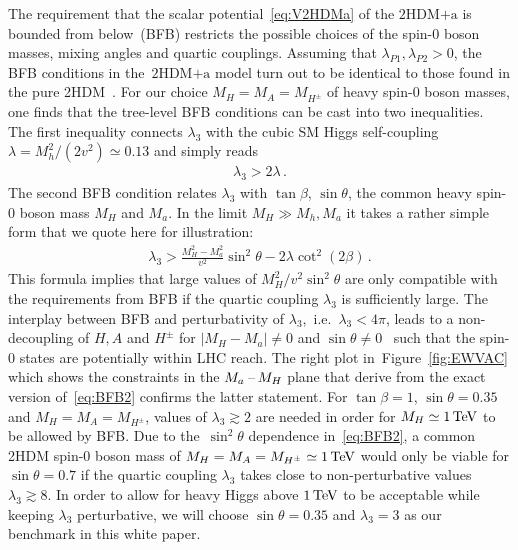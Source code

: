\documentclass[review]{elsarticle}
\newcommand{\hdma}{\ensuremath{\textrm{2HDM+a}}\xspace}
\begin{document}
The requirement that the scalar potential~\eqref{eq:V2HDMa} of the \hdma  is bounded from below~(BFB) restricts the possible choices of the spin-0 boson masses, mixing angles and quartic couplings. Assuming that $\lambda_{P1}, \lambda_{P2} > 0$, the  BFB conditions in the~\hdma model turn out to be identical to those found in the pure 2HDM~\cite{Gunion:2002zf}. For our choice $M_H = M_A = M_{H^\pm}$ of heavy spin-0 boson masses, one finds that the tree-level BFB conditions can be cast into  two inequalities. The first inequality connects $\lambda_3$ with the cubic SM Higgs self-coupling $\lambda = M_h^2/(2 v^2) \simeq 0.13$ and simply reads   
\begin{align} \label{eq:BFB1}
\lambda_3 > 2 \lambda  \,.
\end{align}
The second BFB condition relates $\lambda_3$ with $\tan \beta$, $\sin \theta$, the common heavy  spin-0 boson  mass $M_H$ and $M_a$. In the limit $M_H \gg M_h, M_a$ it takes a rather simple form that we quote here for illustration: 
\begin{align} \label{eq:BFB2}
\lambda_3 > \frac{M_H^2 -M_a^2}{v^2} \sin^2 \theta  - 2 \lambda \cot^2 (2 \beta )  \,.
\end{align}
This formula implies that large values of $M_H^2/v^2 \sin^2 \theta$ are only compatible with the requirements from BFB if the quartic coupling $\lambda_3$ is sufficiently large.  The interplay between BFB and perturbativity of $\lambda_3$,~i.e.~$\lambda_3 < 4 \pi$, leads to a non-decoupling of $H, A$ and $H^\pm$ for $|M_H - M_a| \neq 0$ and $\sin \theta  \neq 0$~\cite{Goncalves:2016iyg} such that the spin-0 states are potentially within LHC reach. The right plot in~Figure~\ref{fig:EWVAC} which shows the constraints in the $M_{a}\hspace{0.5mm}$--$\hspace{0.5mm} M_H$ plane that derive from the exact version of~\eqref{eq:BFB2} confirms the latter statement. For $\tan \beta = 1$, $\sin \theta = 0.35$ and $M_H = M_A = M_{H^\pm}$, values of $\lambda_3 \gtrsim 2$ are needed in order for $M_H \simeq 1 \, {\rm TeV}$ to be allowed by BFB.  Due to the~$\sin^2 \theta$ dependence in~\eqref{eq:BFB2},   a common 2HDM  spin-0 boson  mass of $M_H = M_A = M_{H^\pm} \simeq 1 \, {\rm TeV}$ would only be viable for $\sin \theta = 0.7$ if the quartic coupling $\lambda_3$ takes close to non-perturbative values $\lambda_3 \gtrsim 8$. In order to allow for heavy Higgs above $1 \, {\rm TeV}$ to be acceptable while keeping $\lambda_3$ perturbative, we will choose $\sin \theta = 0.35$ and $\lambda_3 = 3$ as our benchmark in this white paper.  
\end{document}
